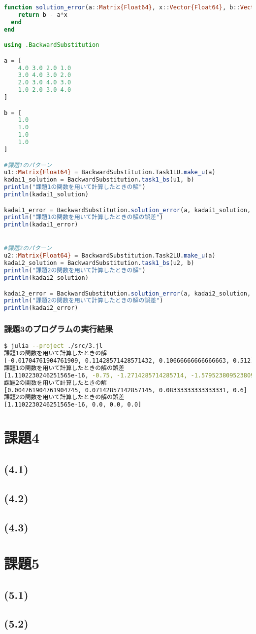 \documentclass[uplatex, dvipdfmx, a4j,11pt]{jsarticle}
\begin{document}
\begin{lstlisting}[title={課題3の全体のプログラム}, label=code:in, language=Julia]
  function solution_error(a::Matrix{Float64}, x::Vector{Float64}, b::Vector{Float64})
    return b - a*x
  end
end

using .BackwardSubstitution

a = [
    4.0 3.0 2.0 1.0
    3.0 4.0 3.0 2.0
    2.0 3.0 4.0 3.0
    1.0 2.0 3.0 4.0
]

b = [
    1.0
    1.0
    1.0
    1.0
]

#課題1のパターン
u1::Matrix{Float64} = BackwardSubstitution.Task1LU.make_u(a)
kadai1_solution = BackwardSubstitution.task1_bs(u1, b)
println("課題1の関数を用いて計算したときの解")
println(kadai1_solution)

kadai1_error = BackwardSubstitution.solution_error(a, kadai1_solution, b)
println("課題1の関数を用いて計算したときの解の誤差")
println(kadai1_error)


#課題2のパターン
u2::Matrix{Float64} = BackwardSubstitution.Task2LU.make_u(a)
kadai2_solution = BackwardSubstitution.task1_bs(u2, b)
println("課題2の関数を用いて計算したときの解")
println(kadai2_solution)

kadai2_error = BackwardSubstitution.solution_error(a, kadai2_solution, b)
println("課題2の関数を用いて計算したときの解の誤差")
println(kadai2_error)
\end{lstlisting}

\subsubsection*{課題3のプログラムの実行結果}
\begin{lstlisting}[title={課題3のプログラムの実行結果}, label=code:in, language=sh]
$ julia --project ./src/3.jl
課題1の関数を用いて計算したときの解
[-0.01704761904761909, 0.11428571428571432, 0.10666666666666663, 0.512]
課題1の関数を用いて計算したときの解の誤差
[1.1102230246251565e-16, -0.75, -1.2714285714285714, -1.5795238095238093]
課題2の関数を用いて計算したときの解
[0.004761904761904745, 0.07142857142857145, 0.08333333333333331, 0.6]
課題2の関数を用いて計算したときの解の誤差
[1.1102230246251565e-16, 0.0, 0.0, 0.0]
\end{lstlisting}

\section*{課題4}
\subsection*{(4.1)}
\subsection*{(4.2)}
\subsection*{(4.3)}

\section*{課題5}
\subsection*{(5.1)}
\subsection*{(5.2)}
\end{document}
